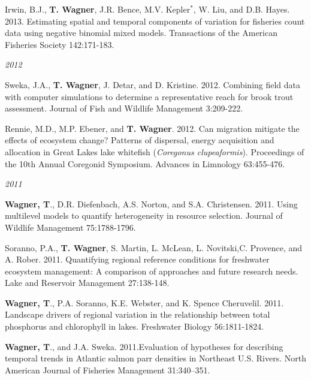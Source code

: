 \documentclass[10pt]{article}
\begin{document}
\begin{flushleft}
\begin{etaremune}[start=28]
\item Irwin, B.J., {\bf T. Wagner}, J.R. Bence, M.V. Kepler$^*$, W. Liu, and D.B. Hayes. 2013. Estimating spatial and temporal components of variation for fisheries count data using negative binomial mixed models. Transactions of the American Fisheries Society 142:171-183.

\end{etaremune}
\emph{2012}
\begin{etaremune}[start=24]
\item Sweka, J.A., {\bf T. Wagner}, J. Detar, and D. Kristine. 2012. Combining field data with computer simulations to determine a representative reach for brook trout assessment. Journal of Fish and Wildlife Management 3:209-222.

\item Rennie, M.D., M.P. Ebener, and {\bf T. Wagner}. 2012. Can migration mitigate the effects of ecosystem change? Patterns of dispersal, energy acquisition and allocation in Great Lakes lake whitefish (\emph{Coregonus clupeaformis}). Proceedings of the 10th Annual Coregonid Symposium. Advances in Limnology 63:455-476. 

\end{etaremune}
\emph{2011}
\begin{etaremune}[start=22]
\item {\bf Wagner, T}., D.R. Diefenbach, A.S. Norton, and S.A. Christensen. 2011. Using multilevel models to quantify heterogeneity in resource selection. Journal of Wildlife Management 75:1788-1796. 

\item Soranno, P.A., {\bf T. Wagner}, S. Martin, L. McLean, L. Novitski,C. Provence, and A. Rober. 2011. Quantifying regional reference conditions for freshwater ecosystem management: A comparison of approaches and future research needs. Lake and Reservoir Management 27:138-148. 

\item {\bf Wagner, T}., P.A. Soranno, K.E. Webster, and K. Spence Cheruvelil. 2011. Landscape drivers of regional variation in the relationship between total phosphorus and chlorophyll in lakes. Freshwater Biology 56:1811-1824.

\item {\bf Wagner, T}., and J.A. Sweka. 2011.Evaluation of hypotheses for describing temporal trends in Atlantic salmon parr densities in Northeast U.S. Rivers. North American Journal of Fisheries Management 31:340–351. 


\end{etaremune}
\end{flushleft}
\end{document}
